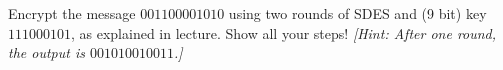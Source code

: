 
\begin{problem}
Encrypt the message $001100001010$ using two rounds of SDES and (9 bit) key
$111000101$, as explained in lecture.  Show all your steps! \emph{[Hint: After one round, the output is $001010010011$.]}
\end{problem}
